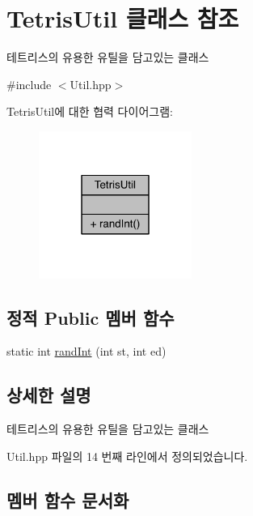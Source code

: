 \hypertarget{class_tetris_util}{}\section{Tetris\+Util 클래스 참조}
\label{class_tetris_util}


테트리스의 유용한 유틸을 담고있는 클래스  




{\ttfamily \#include $<$Util.\+hpp$>$}



Tetris\+Util에 대한 협력 다이어그램\+:
\nopagebreak
\begin{figure}[H]
\begin{center}
\leavevmode
\includegraphics[width=142pt]{d9/d93/class_tetris_util__coll__graph}
\end{center}
\end{figure}
\subsection*{정적 Public 멤버 함수}
\begin{DoxyCompactItemize}
\item 
static int \hyperlink{class_tetris_util_a0a60e809425ddb416a500bcc03cf7061}{rand\+Int} (int st, int ed)
\end{DoxyCompactItemize}


\subsection{상세한 설명}
테트리스의 유용한 유틸을 담고있는 클래스 

Util.\+hpp 파일의 14 번째 라인에서 정의되었습니다.



\subsection{멤버 함수 문서화}
\mbox{\label{class_tetris_util_a0a60e809425ddb416a500bcc03cf7061}} 
